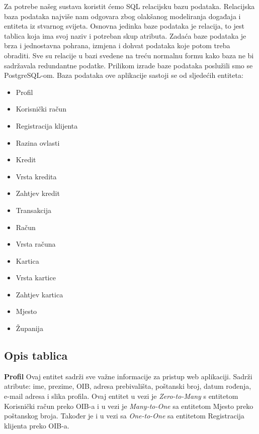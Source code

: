 			
		Za potrebe našeg sustava koristit ćemo SQL relacijsku bazu podataka. Relacijska baza podataka najviše nam odgovara zbog olakšanog modeliranja događaja i entiteta iz stvarnog svijeta. Osnovna jedinka baze podataka je relacija, to jest tablica koja ima svoj naziv i potreban skup atributa. Zadaća baze podataka je brza i jednostavna pohrana, izmjena i dohvat podataka koje potom treba obraditi. Sve su relacije u bazi svedene na treću normalnu formu kako baza ne bi sadržavala redundantne podatke. Prilikom izrade baze podataka poslužili smo se PostgreSQL-om.
		Baza podataka ove aplikacije sastoji se od sljedećih entiteta:
		\begin{itemize}
			\item 	Profil
			\item 	Korisnički račun
			\item 	Registracija klijenta
			\item   Razina ovlasti
			\item   Kredit
			\item   Vrsta kredita
			\item  	Zahtjev kredit
			\item   Transakcija
			\item   Račun
			\item   Vrsta računa
			\item   Kartica
			\item   Vrsta kartice
			\item 	Zahtjev kartica	
			\item   Mjesto
			\item   Županija	
		\end{itemize}
		
		\eject
		
			\subsection{Opis tablica}
			

				\textbf{Profil} Ovaj entitet sadrži sve važne informacije za pristup web aplikaciji. Sadrži atribute: ime, prezime, OIB, adresa prebivališta, poštanski broj, datum rođenja, e-mail adresa i slika profila. Ovaj entitet u vezi je \textit{Zero-to-Many} s entitetom Korisnički račun preko OIB-a i u vezi je \textit{Many-to-One} sa entitetom Mjesto preko poštanskog broja. Također je i u vezi sa \textit{One-to-One} sa entitetom Registracija klijenta preko OIB-a.
				
